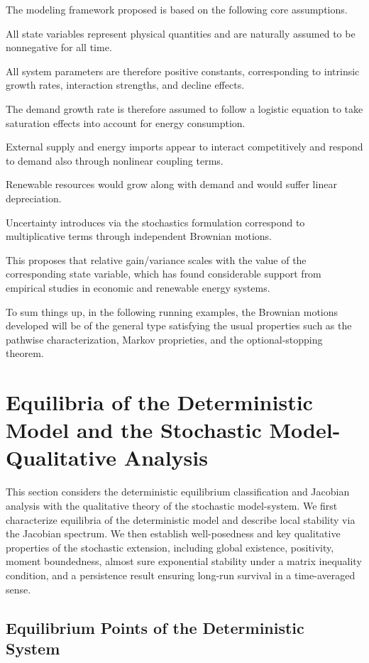 \documentclass[11pt]{article}
\numberwithin{equation}{section}
\begin{document}
The modeling framework proposed is based on the following core assumptions.

All state variables represent physical quantities and are naturally assumed to be nonnegative for all time.

All system parameters are therefore positive constants, corresponding to intrinsic growth rates, interaction strengths, and decline effects.

The demand growth rate is therefore assumed to follow a logistic equation to take saturation effects into account for energy consumption.

External supply and energy imports appear to interact competitively and respond to demand also through nonlinear coupling terms.

Renewable resources would grow along with demand and would suffer linear depreciation.

Uncertainty introduces via the stochastics formulation correspond to multiplicative terms through independent Brownian motions.

This proposes that relative gain/variance scales with the value of the corresponding state variable, which has found considerable support from empirical studies in economic and renewable energy systems.

To sum things up, in the following running examples, the Brownian motions developed will be of the general type satisfying the usual properties such as the pathwise characterization, Markov proprieties, and the optional-stopping theorem.

\section{Equilibria of the Deterministic Model and the Stochastic Model-Qualitative Analysis}

This section considers the deterministic equilibrium classification and Jacobian analysis with the qualitative theory of the stochastic model-system. We first characterize equilibria of the deterministic model and describe local stability via the Jacobian spectrum. We then establish well-posedness and key qualitative properties of the stochastic extension, including global existence, positivity, moment boundedness, almost sure exponential stability under a matrix inequality condition, and a persistence result ensuring long-run survival in a time-averaged sense.

\subsection{Equilibrium Points of the Deterministic System}
\end{document}
